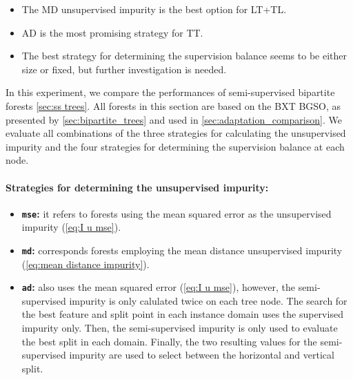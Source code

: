 \begin{mdframed}[frametitle={Key findings}]
    \begin{itemize}
        \item The MD unsupervised impurity is the best option for LT+TL.
        \item AD is the most promising strategy for TT.
        \item The best strategy for determining the supervision balance seems to be either size or fixed, but further investigation is needed.
    \end{itemize}
\end{mdframed}

In this experiment, we compare the performances of semi-supervised bipartite forests \autoref{sec:ss trees}. All forests in this section are based on the BXT BGSO, as presented by \autoref{sec:bipartite_trees} and used in \autoref{sec:adaptation_comparison}. We evaluate all combinations of the three strategies for calculating the unsupervised impurity and the four strategies for determining the supervision balance at each node.

\paragraph*{Strategies for determining the unsupervised impurity:}
\begin{itemize}
    \item \textbf{\texttt{mse}:} it refers to forests using the mean squared error as the unsupervised impurity (\autoref{eq:I u mse}).
    \item \textbf{\texttt{md}:} corresponds forests employing the mean distance unsupervised impurity (\autoref{eq:mean distance impurity}).
    \item \textbf{\texttt{ad}:} also uses the mean squared error (\autoref{eq:I u mse}), however, the semi-supervised impurity is only calulated twice on each tree node. The search for the best feature and split point in each instance domain uses the supervised impurity only. Then, the semi-supervised impurity is only used to evaluate the best split in each domain. Finally, the two resulting values for the semi-supervised impurity are used to select between the horizontal and vertical split.
\end{itemize}

